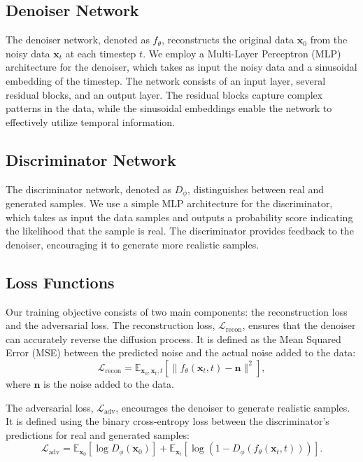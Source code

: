 \documentclass{article} %
\begin{document}
\subsection{Denoiser Network}
The denoiser network, denoted as $f_\theta$, reconstructs the original data $\mathbf{x}_0$ from the noisy data $\mathbf{x}_t$ at each timestep $t$. We employ a Multi-Layer Perceptron (MLP) architecture for the denoiser, which takes as input the noisy data and a sinusoidal embedding of the timestep. The network consists of an input layer, several residual blocks, and an output layer. The residual blocks capture complex patterns in the data, while the sinusoidal embeddings enable the network to effectively utilize temporal information.

\subsection{Discriminator Network}
The discriminator network, denoted as $D_\phi$, distinguishes between real and generated samples. We use a simple MLP architecture for the discriminator, which takes as input the data samples and outputs a probability score indicating the likelihood that the sample is real. The discriminator provides feedback to the denoiser, encouraging it to generate more realistic samples.

\subsection{Loss Functions}
Our training objective consists of two main components: the reconstruction loss and the adversarial loss. The reconstruction loss, $\mathcal{L}_{\text{recon}}$, ensures that the denoiser can accurately reverse the diffusion process. It is defined as the Mean Squared Error (MSE) between the predicted noise and the actual noise added to the data:
\begin{equation}
    \mathcal{L}_{\text{recon}} = \mathbb{E}_{\mathbf{x}_0, \mathbf{x}_t, t} \left[ \| f_\theta(\mathbf{x}_t, t) - \mathbf{n} \|^2 \right],
\end{equation}
where $\mathbf{n}$ is the noise added to the data.

The adversarial loss, $\mathcal{L}_{\text{adv}}$, encourages the denoiser to generate realistic samples. It is defined using the binary cross-entropy loss between the discriminator's predictions for real and generated samples:
\begin{equation}
    \mathcal{L}_{\text{adv}} = \mathbb{E}_{\mathbf{x}_0} \left[ \log D_\phi(\mathbf{x}_0) \right] + \mathbb{E}_{\mathbf{x}_t} \left[ \log (1 - D_\phi(f_\theta(\mathbf{x}_t, t))) \right].
\end{equation}
\end{document}
